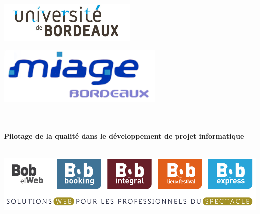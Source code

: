 
\begin{titlepage}

\AddToShipoutPicture*{\backgroundMain}


\begin{center}

    
    \begin{minipage}{.5\textwidth}
    	\begin{flushleft}
    		\includegraphics[width=0.5\textwidth]{assets/logo_bdx.jpg}~\\[1cm]
    	\end{flushleft}
    \end{minipage}%
    \begin{minipage}{.5\textwidth}
    	\begin{flushright}
    		\includegraphics[width=0.6\textwidth]{assets/miage_bordeaux.jpg}~\\[1cm]
    	\end{flushright}
    \end{minipage}
    
    \\[12\baselineskip] 

    \HRule \\[0.4cm]
    { \huge \bfseries Pilotage de la qualité dans le développement de projet informatique\\[0.4cm] }

    \HRule \\[2cm]
    \includegraphics[scale=0.5]{assets/bob_logos.png}
    \\[2cm]


\end{center}
\end{titlepage}
